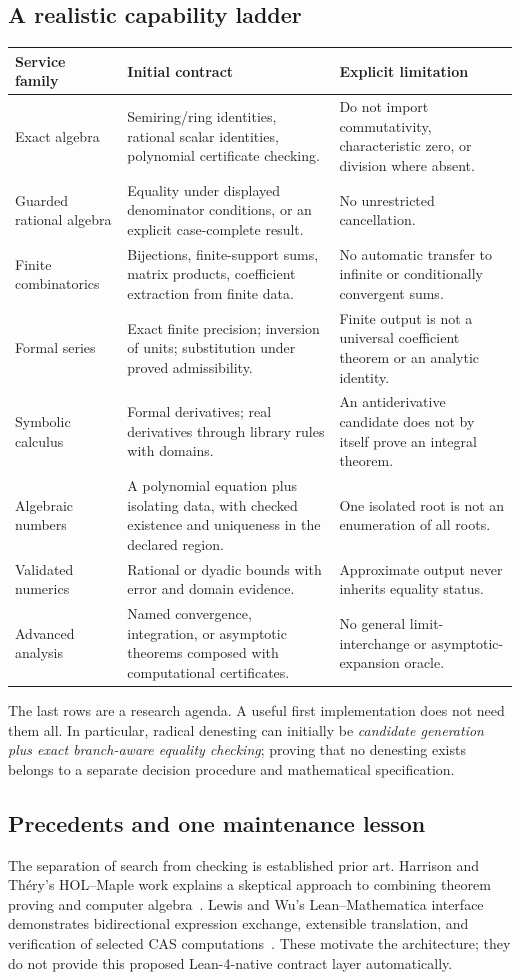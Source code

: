 \documentclass[11pt,a4paper]{article}
\theoremstyle{remark}\newtheorem{example}[proposition]{Example}
\begin{document}
\subsection{A realistic capability ladder}
\begin{longtable}{@{}P{.21\textwidth}P{.41\textwidth}P{.30\textwidth}@{}}
\toprule
Service family & Initial contract & Explicit limitation \\
\midrule\endhead
Exact algebra & Semiring/ring identities, rational scalar identities, polynomial certificate checking. & Do not import commutativity, characteristic zero, or division where absent.\\
Guarded rational algebra & Equality under displayed denominator conditions, or an explicit case-complete result. & No unrestricted cancellation.\\
Finite combinatorics & Bijections, finite-support sums, matrix products, coefficient extraction from finite data. & No automatic transfer to infinite or conditionally convergent sums.\\
Formal series & Exact finite precision; inversion of units; substitution under proved admissibility. & Finite output is not a universal coefficient theorem or an analytic identity.\\
Symbolic calculus & Formal derivatives; real derivatives through library rules with domains. & An antiderivative candidate does not by itself prove an integral theorem.\\
Algebraic numbers & A polynomial equation plus isolating data, with checked existence and uniqueness in the declared region. & One isolated root is not an enumeration of all roots.\\
Validated numerics & Rational or dyadic bounds with error and domain evidence. & Approximate output never inherits equality status.\\
Advanced analysis & Named convergence, integration, or asymptotic theorems composed with computational certificates. & No general limit-interchange or asymptotic-expansion oracle.\\
\bottomrule
\end{longtable}
The last rows are a research agenda. A useful first implementation does not need them all. In particular, radical denesting can initially be \emph{candidate generation plus exact branch-aware equality checking}; proving that no denesting exists belongs to a separate decision procedure and mathematical specification.

\subsection{Precedents and one maintenance lesson}
The separation of search from checking is established prior art. Harrison and Th\'ery's HOL--Maple work explains a skeptical approach to combining theorem proving and computer algebra~\cite{harrison}. Lewis and Wu's Lean--Mathematica interface demonstrates bidirectional expression exchange, extensible translation, and verification of selected CAS computations~\cite{lewiswu}. These motivate the architecture; they do not provide this proposed Lean-4-native contract layer automatically.
\end{document}

